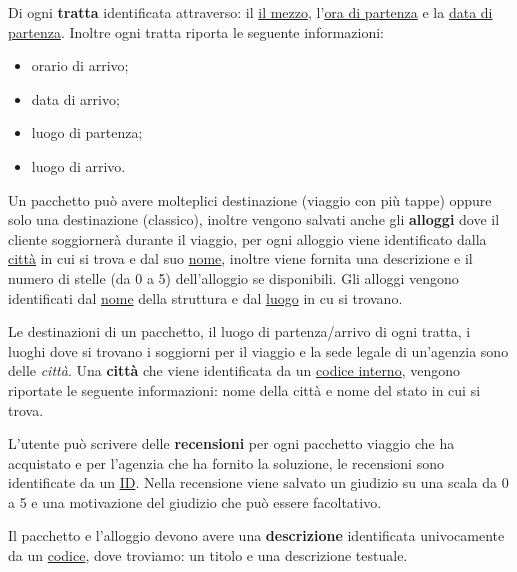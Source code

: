 Di ogni \textbf{tratta} identificata attraverso: il \underline{il mezzo}, l'\underline{ora di partenza} e la \underline{data di partenza}. Inoltre ogni tratta riporta le seguente informazioni:
\begin{multicols}{2}
    \begin{itemize}
        \item orario di arrivo;
        \item data di arrivo;
        \item luogo di partenza;
        \item luogo di arrivo.
    \end{itemize}
\end{multicols}

%
%
Un pacchetto può avere molteplici destinazione (viaggio con più tappe) oppure solo una destinazione (classico), inoltre vengono salvati anche gli \textbf{alloggi} dove il cliente soggiornerà durante il viaggio, per ogni alloggio viene identificato dalla \underline{città} in cui si trova e dal suo \underline{nome}, inoltre viene fornita una descrizione e il numero di stelle (da 0 a 5) dell'alloggio se disponibili. Gli alloggi vengono identificati dal \underline{nome} della struttura e dal \underline{luogo} in cu si trovano.

%
%
Le destinazioni di un pacchetto, il luogo di partenza/arrivo di ogni tratta, i luoghi dove si trovano i soggiorni per il viaggio e la sede legale di un'agenzia sono delle \emph{città}. Una \textbf{città} che viene identificata da un \underline{codice interno}, vengono riportate le seguente informazioni: nome della città e nome del stato in cui si trova.

%
%
L'utente può scrivere delle \textbf{recensioni} per ogni pacchetto viaggio che ha acquistato e per l'agenzia che ha fornito la soluzione, le recensioni sono identificate da un \underline{ID}. Nella recensione viene salvato un giudizio su una scala da 0 a 5 e una motivazione del giudizio che può essere facoltativo.

%
%
Il pacchetto e l'alloggio devono avere una \textbf{descrizione} identificata univocamente da un \underline{codice}, dove troviamo: un titolo e una descrizione testuale.
%

